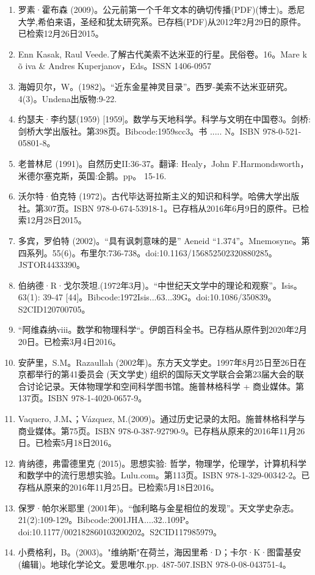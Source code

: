 \begin{enumerate}
\item 罗素·霍布森 (2009)。公元前第一个千年文本的确切传播(PDF)(博士)。悉尼大学,希伯来语，圣经和犹太研究系。已存档(PDF)从2012年2月29日的原件。已检索12月26日2015。
\item Enn Kasak, Raul Veede.了解古代美索不达米亚的行星。民俗卷。16。Mare k õ iva & Andres Kuperjanov，Eds。ISSN 1406-0957
\item 海姆贝尔，W。(1982)。“近东金星神灵目录”。西罗-美索不达米亚研究。4(3)。Undena出版物:9-22.
\item 约瑟夫·李约瑟(1959) [1959]。数学与天地科学。科学与文明在中国卷3。剑桥: 剑桥大学出版社。第398页。Bibcode:1959scc3。书 ..... N。ISBN 978-0-521-05801-8。
\item 老普林尼 (1991)。自然历史II:36-37。翻译: Healy，John F.Harmondsworth，米德尔塞克斯，英国:企鹅。pp。 15-16.
\item 沃尔特·伯克特 (1972)。古代毕达哥拉斯主义的知识和科学。哈佛大学出版社。第307页。ISBN 978-0-674-53918-1。已存档从2016年6月9日的原件。已检索12月28日2015。
\item 多宾，罗伯特 (2002)。“具有讽刺意味的是” Aeneid “1.374”。Mnemosyne。第四系列。55(6)。布里尔:736-738。doi:10.1163/156852502320880285。JSTOR4433390。 
\item 伯纳德·R·戈尔茨坦.(1972年3月)。“中世纪天文学中的理论和观察”。Isis。63(1): 39-47 [44]。Bibcode:1972Isis...63...39G。doi:10.1086/350839。S2CID120700705。 
\item “阿维森纳viii。数学和物理科学“。伊朗百科全书。已存档从原件到2020年2月20日。已检索3月4日2016。
\item 安萨里，S.M。Razaullah (2002年)。东方天文学史。1997年8月25日至26日在京都举行的第41委员会 (天文学史) 组织的国际天文学联合会第23届大会的联合讨论记录。天体物理学和空间科学图书馆。施普林格科学 + 商业媒体。第137页。ISBN 978-1-4020-0657-9。
\item Vaquero, J.M、；Vázquez, M.(2009)。通过历史记录的太阳。施普林格科学与商业媒体。第75页。ISBN 978-0-387-92790-9。已存档从原来的2016年11月26日。已检索5月18日2016。
\item 肯纳德，弗雷德里克 (2015)。思想实验: 哲学，物理学，伦理学，计算机科学和数学中的流行思想实验。Lulu.com。第113页。ISBN 978-1-329-00342-2。已存档从原来的2016年11月25日。已检索5月18日2016。
\item 保罗·帕尔米耶里 (2001年)。“伽利略与金星相位的发现”。天文学史杂志。21(2):109-129。Bibcode:2001JHA....32..109P。doi:10.1177/002182860103200202。S2CID117985979。 
\item 小费格利，B。(2003)。"维纳斯"在荷兰，海因里希·D；卡尔·K·图雷基安 (编辑)。地球化学论文。爱思唯尔.pp. 487-507.ISBN 978-0-08-043751-4。

\end{enumerate}
